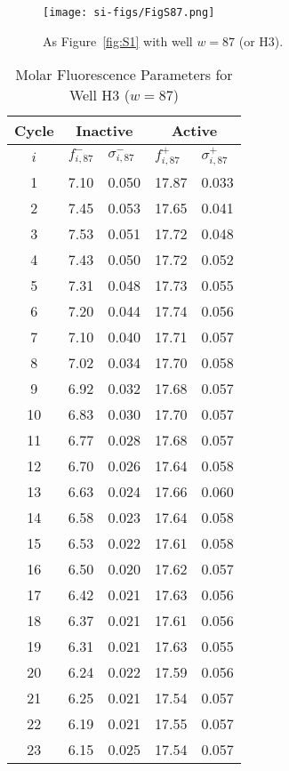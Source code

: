                 \begin{figure}
                    \centering
                    \texttt{[image: si-figs/FigS87.png]}
                    \caption{
                        As Figure~\ref{fig:S1} with well $w=87$ (or H3).
                    }
                \end{figure}
                \clearpage
    \begin{table}
        \caption{Molar Fluorescence Parameters for Well H3 ($w=87$)}
        \centering
        \begin{tabular}{c|ll|ll}
            Cycle & \multicolumn{2}{c|}{Inactive} & \multicolumn{2}{c}{Active} \\
            \hline
            $i$ & $f_{i,87}^{-}$ & $\sigma_{i,87}^{-}$ &  $f_{i,87}^{+}$ & $\sigma_{i,87}^{+}$ \\
            \hline
    1 & 7.10 & 0.050 & 17.87 & 0.033 \\
2 & 7.45 & 0.053 & 17.65 & 0.041 \\
3 & 7.53 & 0.051 & 17.72 & 0.048 \\
4 & 7.43 & 0.050 & 17.72 & 0.052 \\
5 & 7.31 & 0.048 & 17.73 & 0.055 \\
6 & 7.20 & 0.044 & 17.74 & 0.056 \\
7 & 7.10 & 0.040 & 17.71 & 0.057 \\
8 & 7.02 & 0.034 & 17.70 & 0.058 \\
9 & 6.92 & 0.032 & 17.68 & 0.057 \\
10 & 6.83 & 0.030 & 17.70 & 0.057 \\
11 & 6.77 & 0.028 & 17.68 & 0.057 \\
12 & 6.70 & 0.026 & 17.64 & 0.058 \\
13 & 6.63 & 0.024 & 17.66 & 0.060 \\
14 & 6.58 & 0.023 & 17.64 & 0.058 \\
15 & 6.53 & 0.022 & 17.61 & 0.058 \\
16 & 6.50 & 0.020 & 17.62 & 0.057 \\
17 & 6.42 & 0.021 & 17.63 & 0.056 \\
18 & 6.37 & 0.021 & 17.61 & 0.056 \\
19 & 6.31 & 0.021 & 17.63 & 0.055 \\
20 & 6.24 & 0.022 & 17.59 & 0.056 \\
21 & 6.25 & 0.021 & 17.54 & 0.057 \\
22 & 6.19 & 0.021 & 17.55 & 0.057 \\
23 & 6.15 & 0.025 & 17.54 & 0.057 \\

\end{tabular}
\end{table}
